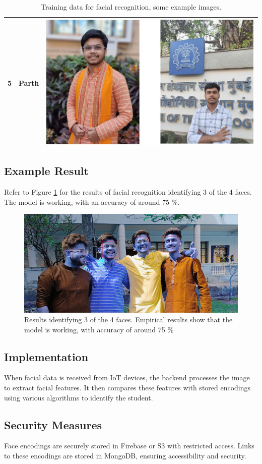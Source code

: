 \documentclass[conference]{IEEEtran}
\begin{document}
\begin{table}[h]
\begin{tabular}{|c|c|c|}
        \hline
        5              & Parth         & \includegraphics[height=.25\textwidth]{parth.jpg}     \\
        \hline
    \end{tabular}
    \caption{Training data for facial recognition, some example images.}
    \label{tab:training-data}
\end{table}
\subsection{Example Result}
Refer to Figure \ref{fig:face-rec-results} for the results of facial recognition identifying 3 of the 4 faces. The model is working, with an accuracy of around 75 \%.
\begin{figure}
    \centering
    \includegraphics[width=.45\textwidth]{face rec results cropped.jpg}
    \caption{Results identifying 3 of the 4 faces. Empirical results show that the model is working, with accuracy of around 75 \%}
    \label{fig:face-rec-results}
\end{figure}
\subsection{Implementation}
When facial data is received from IoT devices, the backend processes the image to extract facial features. It then compares these features with stored encodings using various algorithms to identify the student.

\subsection{Security Measures}
Face encodings are securely stored in Firebase or S3 with restricted access. Links to these encodings are stored in MongoDB, ensuring accessibility and security.
\end{document}
